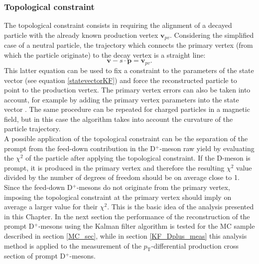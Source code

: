 \documentclass[b5paper,10pt,twoside,oldstyle,classica]{toptesi}
\newcommand{\pt}{p_\text{T}}
\begin{document}
\subsubsection{Topological constraint}
The topological constraint consists in requiring the alignment of a decayed particle with the already known production vertex $\pmb{v}_{pv}$. Considering the simplified case of a neutral particle, the trajectory which connects the primary vertex (from which the particle originate) to the decay vertex is a straight line:
\begin{equation}
 \pmb{v}-s\cdot\pmb{p} = \pmb{v}_{pv}.
\end{equation}
This latter equation can be used to fix a constraint to the parameters of the state vector (see equation \ref{statevectorKF}) and force the reconstructed particle to point to the production vertex. The primary vertex errors can also be taken into account, for example by adding the primary vertex parameters into the state vector \cite{Kisel:2006}. The same procedure can be repeated for charged particles in a magnetic field, but in this case the algorithm takes into account the curvature of the particle trajectory. \\
A possible application of the topological constraint can be the separation of the prompt from the feed-down contribution in the D$^+$-meson raw yield by evaluating the $\chi^2$ of the particle after applying the topological constraint. If the D-meson is prompt, it is produced in the primary vertex and therefore the resulting $\chi^2$ value divided by the number of degrees of freedom should be on average close to 1. Since the feed-down D$^+$-mesons do not originate from the primary vertex, imposing the topological constraint at the primary vertex should imply on average a larger value for their $\chi^2$. This is the basic idea of the analysis presented in this Chapter. In the next section the performance of the reconstruction of the prompt D$^+$-mesons using the Kalman filter algorithm is tested for the MC sample described in section \ref{MC_sec}, while in section \ref{KF_Dplus_meas} this analysis method is applied to the measurement of the $\pt$-differential production cross section of prompt D$^+$-mesons. 
\end{document}
